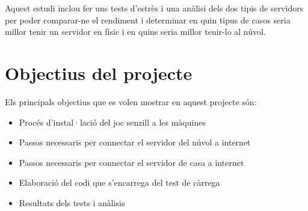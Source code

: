 Aquest estudi inclou fer uns tests d'estrès i una anàlisi dels dos tipis de  servidors per poder comparar-ne el rendiment i determinar en quin tipus de casos seria millor tenir un servidor en físic i en quins seria millor tenir-lo al núvol.

\newpage
\section{Objectius del projecte}

Els principals objectius que es volen mostrar en aquest projecte són:

\begin{itemize}
    \item Procés d'instal·lació del joc senzill a les màquines
    \item Passos necessaris per connectar el servidor del núvol a internet
    \item Passos necessaris per connectar el servidor de casa a internet
    \item Elaboració del codi que s'encarrega del test de càrrega
    \item Resultats dels tests i anàlisis
\end{itemize}
